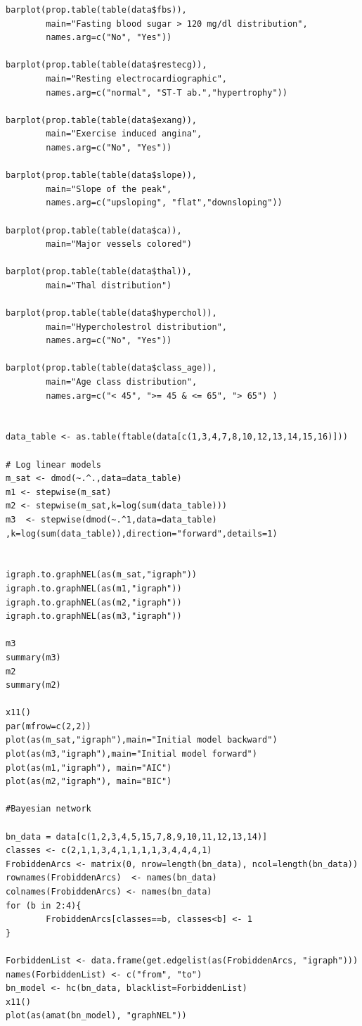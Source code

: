 \documentclass{article}
\begin{document}
\begin{verbatim}
barplot(prop.table(table(data$fbs)), 
        main="Fasting blood sugar > 120 mg/dl distribution",  
        names.arg=c("No", "Yes"))
        
barplot(prop.table(table(data$restecg)), 
        main="Resting electrocardiographic",  
        names.arg=c("normal", "ST-T ab.","hypertrophy"))
        
barplot(prop.table(table(data$exang)), 
        main="Exercise induced angina",  
        names.arg=c("No", "Yes"))
        
barplot(prop.table(table(data$slope)),
        main="Slope of the peak",  
        names.arg=c("upsloping", "flat","downsloping"))
        
barplot(prop.table(table(data$ca)), 
        main="Major vessels colored")
        
barplot(prop.table(table(data$thal)), 
        main="Thal distribution")
        
barplot(prop.table(table(data$hyperchol)), 
        main="Hypercholestrol distribution",  
        names.arg=c("No", "Yes"))
        
barplot(prop.table(table(data$class_age)),
        main="Age class distribution", 
        names.arg=c("< 45", ">= 45 & <= 65", "> 65") )


data_table <- as.table(ftable(data[c(1,3,4,7,8,10,12,13,14,15,16)]))

# Log linear models
m_sat <- dmod(~.^.,data=data_table) 
m1 <- stepwise(m_sat)
m2 <- stepwise(m_sat,k=log(sum(data_table)))
m3  <- stepwise(dmod(~.^1,data=data_table) ,k=log(sum(data_table)),direction="forward",details=1)


igraph.to.graphNEL(as(m_sat,"igraph"))
igraph.to.graphNEL(as(m1,"igraph"))
igraph.to.graphNEL(as(m2,"igraph"))
igraph.to.graphNEL(as(m3,"igraph"))

m3
summary(m3)
m2
summary(m2)

x11()
par(mfrow=c(2,2))
plot(as(m_sat,"igraph"),main="Initial model backward")
plot(as(m3,"igraph"),main="Initial model forward")
plot(as(m1,"igraph"), main="AIC")
plot(as(m2,"igraph"), main="BIC")

#Bayesian network

bn_data = data[c(1,2,3,4,5,15,7,8,9,10,11,12,13,14)]
classes <- c(2,1,1,3,4,1,1,1,1,3,4,4,4,1)
FrobiddenArcs <- matrix(0, nrow=length(bn_data), ncol=length(bn_data)) 
rownames(FrobiddenArcs)  <- names(bn_data) 
colnames(FrobiddenArcs) <- names(bn_data)
for (b in 2:4){
        FrobiddenArcs[classes==b, classes<b] <- 1 
}

ForbiddenList <- data.frame(get.edgelist(as(FrobiddenArcs, "igraph")))
names(ForbiddenList) <- c("from", "to") 
bn_model <- hc(bn_data, blacklist=ForbiddenList)
x11()
plot(as(amat(bn_model), "graphNEL"))


\end{verbatim}
\end{document}
